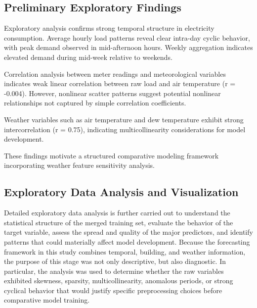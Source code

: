 \documentclass[conference]{IEEEtran}
\begin{document}
\subsection{Preliminary Exploratory Findings}
Exploratory analysis confirms strong temporal structure in electricity consumption. Average hourly load patterns reveal clear intra-day cyclic behavior, with peak demand observed in mid-afternoon hours. Weekly aggregation indicates elevated demand during mid-week relative to weekends.

Correlation analysis between meter readings and meteorological variables indicates weak linear correlation between raw load and air temperature (r = -0.004). However, nonlinear scatter patterns suggest potential nonlinear relationships not captured by simple correlation coefficients.

Weather variables such as air temperature and dew temperature exhibit strong intercorrelation (r = 0.75), indicating multicollinearity considerations for model development.

These findings motivate a structured comparative modeling framework incorporating weather feature sensitivity analysis.

\subsection{Exploratory Data Analysis and Visualization}
Detailed exploratory data analysis is further carried out to understand the statistical structure of the merged training set, evaluate the behavior of the target variable, assess the spread and quality of the major predictors, and identify patterns that could materially affect model development. Because the forecasting framework in this study combines temporal, building, and weather information, the purpose of this stage was not only descriptive, but also diagnostic. In particular, the analysis was used to determine whether the raw variables exhibited skewness, sparsity, multicollinearity, anomalous periods, or strong cyclical behavior that would justify specific preprocessing choices before comparative model training.
\end{document}
